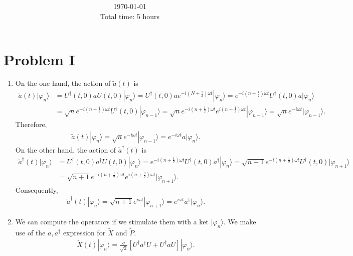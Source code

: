 \documentclass[letterpaper,11pt,twoside]{article}
\title{\textbf{\assignment}\\\course\\{\Large\institution}}
\author{\autor}
\date{\today\\Total time: 5 hours}
\newcommand{\ket}[1]{|#1\rangle}
\begin{document}
\pagestyle{mainstyle}
\maketitle
\section*{Problem I}
\begin{enumerate}[itemsep=0pt,topsep=0pt,label=\alph*)]
  \item On the one hand, the action of $\tilde{a}(t)$ is 
  \begin{align*}
    \tilde{a}(t)\ket{\varphi_n}&=U^\dagger(t,0)aU(t,0)\ket{\varphi_n}=U^\dagger(t,0)ae^{-i\left(N+\frac{1}{2}\right)\omega t}\ket{\varphi_n}=e^{-i\left(n+\frac{1}{2}\right)\omega t}U^\dagger(t,0)a\ket{\varphi_n}\\
    &=\sqrt{n}e^{-i\left(n+\frac{1}{2}\right)\omega t}U^\dagger(t,0)\ket{\varphi_{n-1}}=\sqrt{n}e^{-i\left(n+\frac{1}{2}\right)\omega t}e^{i\left(n-\frac{1}{2}\right)\omega t}\ket{\varphi_{n-1}}=\sqrt{n}e^{-i\omega t}\ket{\varphi_{n-1}}.
  \end{align*}
  Therefore,
  \begin{align*}
    \tilde{a}(t)\ket{\varphi_n}=\sqrt{n}e^{-i\omega t}\ket{\varphi_{n-1}}=e^{-i\omega t}a\ket{\varphi_n}.
  \end{align*}
  On the other hand, the action of $\tilde{a}^\dagger(t)$ is 
  \begin{align*}
    \tilde{a}^\dagger(t)\ket{\varphi_n}&=U^\dagger(t,0)a^\dagger U(t,0)\ket{\varphi_n}=e^{-i\left(n+\frac{1}{2}\right)\omega t}U^\dagger(t,0)a^\dagger\ket{\varphi_n}=\sqrt{n+1}e^{-i\left(n+\frac{1}{2}\right)\omega t}U^\dagger(t,0)\ket{\varphi_{n+1}}\\
    &=\sqrt{n+1}e^{-i\left(n+\frac{1}{2}\right)\omega t}e^{i\left(n+\frac{3}{2}\right)\omega t}\ket{\varphi_{n+1}}.
  \end{align*}
  Consequently,
  \begin{align*}
    \tilde{a}^\dagger(t)\ket{\varphi_n}=\sqrt{n+1}e^{i\omega t}\ket{\varphi_{n+1}}=e^{i\omega t}a^\dagger\ket{\varphi_n}.
  \end{align*}
  \item We can compute the operators if we stimulate them with a ket $\ket{\varphi_n}$. We make use of the $a,a^\dagger$ expression for $\tilde{X}$ and $\tilde{P}$.
  \begin{align*}
    \tilde{X}(t)\ket{\varphi_n}=\frac{\sigma}{\sqrt{2}}\left[U^\dagger a^\dagger U+U^\dagger aU\right]\ket{\varphi_n}.

\end{align*}
\end{enumerate}
\end{document}
